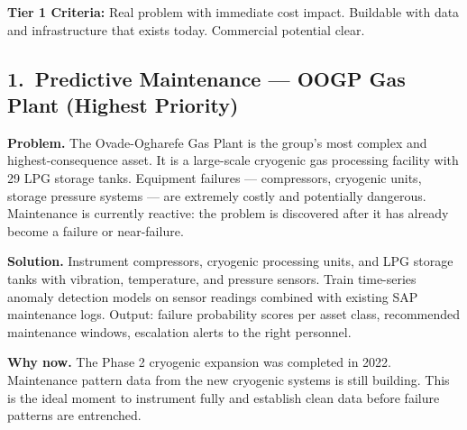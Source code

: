 \documentclass[10pt]{article}
\begin{document}
\noindent\colorbox{tier1!8}{%
\begin{minipage}{\dimexpr\textwidth-2\fboxsep}
  \vspace{3pt}
  {\small\color{tier1}\textbf{Tier 1 Criteria:} Real problem with immediate cost impact.
  Buildable with data and infrastructure that exists today. Commercial potential clear.}
  \vspace{3pt}
\end{minipage}}

\vspace{6pt}

\subsection*{1.\ Predictive Maintenance --- OOGP Gas Plant (Highest Priority)}

{\small
\textbf{Problem.}
The Ovade-Ogharefe Gas Plant is the group's most complex and highest-consequence
asset. It is a large-scale cryogenic gas processing facility with 29 LPG storage
tanks. Equipment failures --- compressors, cryogenic units, storage pressure systems
--- are extremely costly and potentially dangerous. Maintenance is currently reactive:
the problem is discovered after it has already become a failure or near-failure.

\vspace{4pt}
\textbf{Solution.}
Instrument compressors, cryogenic processing units, and LPG storage tanks with
vibration, temperature, and pressure sensors. Train time-series anomaly detection
models on sensor readings combined with existing SAP maintenance logs. Output:
failure probability scores per asset class, recommended maintenance windows,
escalation alerts to the right personnel.

\vspace{4pt}
\textbf{Why now.}
The Phase 2 cryogenic expansion was completed in 2022. Maintenance pattern data
from the new cryogenic systems is still building. This is the ideal moment to
instrument fully and establish clean data before failure patterns are entrenched.
}
\end{document}
